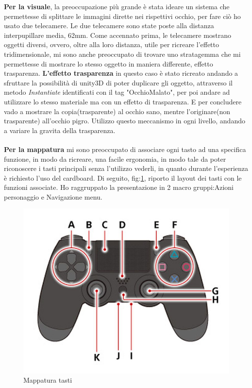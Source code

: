 \documentclass[10pt,a4paper]{article}
\begin{document}
     \textbf{Per la visuale}, la preoccupazione più grande è stata ideare un sistema che permettesse di splittare le immagini dirette nei rispettivi occhio, per fare ciò ho usato due telecamere.
     Le due telecamere sono state poste alla distanza interpupillare media, 62mm\cite{Distanza_occhi}.
     Come accennato prima, le telecamere mostrano oggetti diversi, ovvero, oltre alla loro distanza, utile per ricreare l'effetto tridimensionale, mi sono anche preoccupato di trovare uno stratagemma che mi permettesse di mostrare lo stesso oggetto in maniera differente, effetto trasparenza.
     \textbf{L'effetto trasparenza} in questo caso è stato ricreato andando a sfruttare la possibilità di unity3D di poter duplicare gli oggetto, attraverso il metodo \textit{Instantiate} identificati con il tag "OcchioMalato", per poi andare ad utilizzare lo stesso materiale ma con un effetto di trasparenza.
     E per concludere vado a mostrare la copia(trasparente) al occhio sano, mentre l'originare(non trasparente) all'occhio pigro.
     Utilizzo questo meccanismo in ogni livello, andando a variare la gravita della trasparenza.\\\\
     \textbf{Per la mappatura} mi sono preoccupato di associare ogni tasto ad una specifica funzione, in modo da ricreare, una facile ergonomia, in modo tale da poter riconoscere i tasti principali senza l'utilizzo vederli, in quanto durante l'esperienza è richiesto l'uso del cardboard.
     Di seguito, fig:\ref{fig:gamepad_tasti}, riporto il layout dei tasti con le funzioni associate.
     Ho raggruppato la presentazione in 2 macro gruppi:Azioni personaggio e Navigazione menu.
     \begin{figure}[H]
     	\centering
     	\includegraphics[width=0.8\linewidth]{image/gamepad_tasti}
     	\caption{Mappatura tasti}
     	\label{fig:gamepad_tasti}
     \end{figure}
\end{document}
